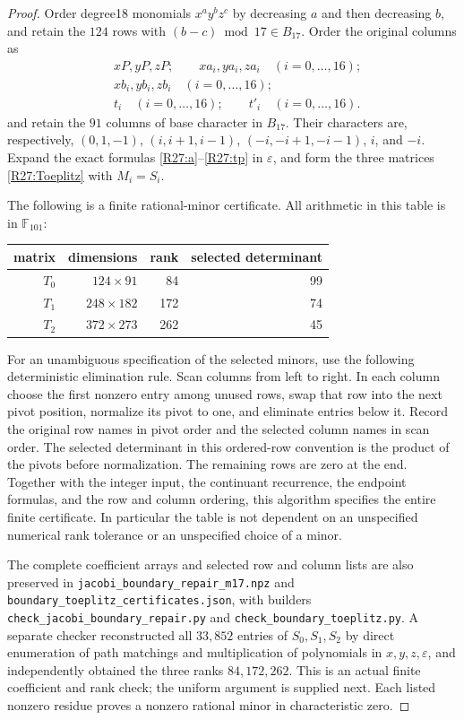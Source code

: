 \begin{proof}
Order degree18 monomials $x^ay^bz^c$ by decreasing $a$ and
then decreasing $b$, and retain the $124$ rows with
$(b-c)\bmod17\in B_{17}$. Order the original columns as
\[
\begin{aligned}
 &xP,yP,zP;\qquad xa_i,ya_i,za_i\quad(i=0,\ldots,16);\\
 &xb_i,yb_i,zb_i\quad(i=0,\ldots,16);\\
 &t_i\quad(i=0,\ldots,16);\qquad t'_i\quad(i=0,\ldots,16).
\end{aligned}
\]
and retain the $91$ columns of base character in $B_{17}$.
Their characters are, respectively,
$(0,1,-1)$, $(i,i+1,i-1)$, $(-i,-i+1,-i-1)$, $i$, and $-i$.
Expand the exact formulas \eqref{R27:a}--\eqref{R27:tp} in
$\varepsilon$, and form the three matrices
\eqref{R27:Toeplitz} with $M_i=S_i$.

The following is a finite rational-minor certificate. All
arithmetic in this table is in $\mathbb F_{101}$:
\begin{center}
\begin{tabular}{rrrr}
matrix&dimensions&rank&selected determinant\\ \hline
$T_0$&$124\times91$&84&99\\
$T_1$&$248\times182$&172&74\\
$T_2$&$372\times273$&262&45
\end{tabular}
\end{center}
For an unambiguous specification of the selected minors, use
the following deterministic elimination rule. Scan columns
from left to right. In each column choose the first nonzero
entry among unused rows, swap that row into the next pivot
position, normalize its pivot to one, and eliminate entries
below it. Record the original row names in pivot order and the
selected column names in scan order. The selected determinant
in this ordered-row convention is the product of the pivots
before normalization. The remaining rows are zero at the end.
Together with the integer input, the continuant recurrence,
the endpoint formulas, and the row and column ordering, this
algorithm specifies the entire finite certificate. In particular
the table is not dependent on an unspecified numerical rank
tolerance or an unspecified choice of a minor.

The complete coefficient arrays and selected row and column
lists are also preserved in
\texttt{jacobi\_boundary\_repair\_m17.npz} and
\texttt{boundary\_toeplitz\_certificates.json}, with builders
\texttt{check\_jacobi\_boundary\_repair.py} and
\texttt{check\_boundary\_toeplitz.py}. A separate checker
reconstructed all $33{,}852$ entries of $S_0,S_1,S_2$ by direct
enumeration of path matchings and multiplication of polynomials
in $x,y,z,\varepsilon$, and independently obtained the three
ranks $84,172,262$. This is an actual finite coefficient and
rank check; the uniform argument is supplied next. Each listed
nonzero residue proves a nonzero rational minor in
characteristic zero.


\end{proof}
